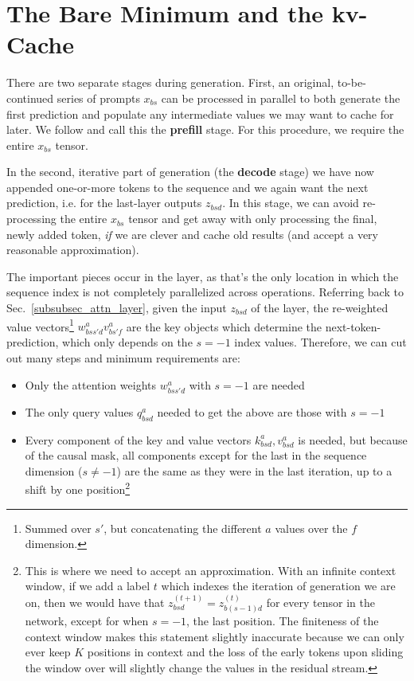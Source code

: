 \documentclass[11pt]{article}
\begin{document}
\section{The Bare Minimum and the kv-Cache \label{sec_kv_cache}}


There are two separate stages during generation. First, an original, to-be-continued series of prompts
$ x _{ bs }  $ can be processed in parallel to both generate the first prediction and populate any
intermediate values we may want to cache for later. We follow \cite{pope2022efficiently} and call this the
\textbf{prefill} stage. For this procedure, we require the entire $ x _{ bs } $ tensor.

In the second, iterative part of generation (the \textbf{decode} stage) we have now appended
one-or-more tokens to the sequence and we again want the next prediction, i.e. 
for the last-layer outputs $ z _{ bsd } $. In this stage, we can avoid re-processing the entire $ x
		_{ bs } $ tensor and get away with only processing the final, newly added token, \textit{if} we are
clever and cache old results (and accept a very reasonable approximation).

The important pieces occur in the  layer, as that's the only location in
which the sequence index is not completely parallelized across operations. Referring back to
Sec.~\ref{subsubsec_attn_layer}, given the input $ z _{ bsd } $ of the 
layer, the re-weighted value vectors\footnote{Summed over $ s' $, but concatenating the different $
		a $ values over the $ f $ dimension.} $ w ^{ a }_{ bss'd } v ^{ a } _{ bs'f } $ are the key objects
which determine the next-token-prediction, which only depends on the $ s=-1 $ index values.
Therefore, we can cut out many steps and minimum requirements are:
\begin{itemize}
	\item Only the attention weights $ w ^{ a }_{ bss'd }$ with $ s=-1 $ are needed
	\item The only query values $ q ^{ a }_{ bsd } $ needed to get the above are those with $ s=-1 $
	\item Every component of the key and value vectors $k ^{ a }_{ bsd }, v ^{ a }_{ bsd } $ is
          needed, but because of the causal mask, all components except for the last in the sequence
          dimension ($ s\neq -1 $) are the same as they were in the last iteration, up to a shift by
          one position\footnote{This is where we need to accept an approximation. With an infinite
          context window, if we add a label $ t $ which indexes the iteration of generation we are
          on, then we would have that $ z ^{ (t+1) } _{ bsd } = z ^{ (t)} _{ b (s-1)d } $ for every
          tensor in the network, except for when $ s=-1 $, the last position. The finiteness of the
          context window makes this statement slightly inaccurate because we can only ever keep $ K
          $ positions in context and the loss of the early tokens upon sliding the window over will
          slightly change the values in the residual stream.}
\end{itemize}
\end{document}
